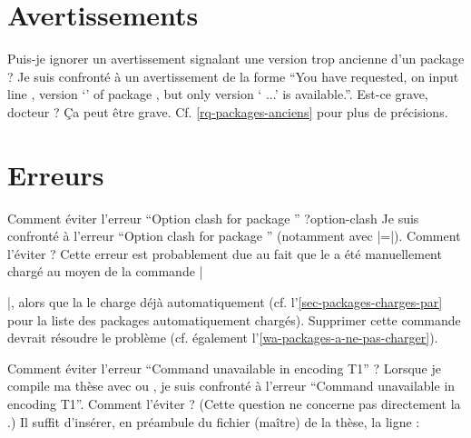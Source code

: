 \section{Avertissements}
\label{sec-avertissements}

\begin{dbfaq}{Puis-je ignorer un avertissement signalant une version trop
    ancienne d'un package ?}{}
  Je suis confronté à un avertissement de la forme \enquote{You have requested,
    on input line , version `' of package
    , but only version ` ...'
    is available.}. Est-ce grave, docteur ?
  \tcblower
  Ça peut être grave. Cf. \vref{rq-packages-anciens} pour plus de précisions.
\end{dbfaq}

\section{Erreurs}
\label{sec-erreurs}

\begin{dbfaq}{Comment éviter l'erreur \enquote{Option clash for package
      } ?}{option-clash}
  Je suis confronté à l'erreur \enquote{Option clash for package
    } (notamment avec |=|). Comment
  l'éviter ?
  \tcblower
  Cette erreur est probablement due au fait que le  a été
  manuellement chargé au moyen de la commande
  |\usepackage[...]{|\meta{package}|}|, alors que la \yatCl{} le charge déjà
  automatiquement (cf. l'\vref{sec-packages-charges-par} pour la liste des
  packages automatiquement chargés). Supprimer cette commande devrait résoudre
  le problème (cf. également l'\vref{wa-packages-a-ne-pas-charger}).
\end{dbfaq}

\begin{dbfaq}{Comment éviter l'erreur \enquote{Command
      \protect{} unavailable in encoding T1} ?}{}
  Lorsque je compile ma thèse avec  ou , je
  suis confronté à l'erreur \enquote{Command
     unavailable in encoding T1}. Comment
  l'éviter ?
  \tcblower
  (Cette question ne concerne pas directement la \yatCl{}.) Il suffit d'insérer,
  en préambule du fichier (maître) de la thèse, la
  ligne :
\begin{preamblecode}[title=Par exemple dans le \File{\configurationfile}]
\end{preamblecode}
\end{dbfaq}

